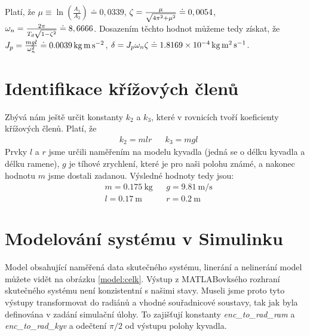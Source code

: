 \documentclass[11pt,a4paper]{article}
\begin{document}
Platí, že $\mu \equiv \ln{(\frac{A_1}{A_2})} \doteq 0,0339$, $\zeta = \frac{\mu}{\sqrt{4 \pi^2 + \mu^2}} \doteq 0,0054$, $\omega_n = \frac{2 \pi}{T_d \sqrt{1 - \zeta^2}} \doteq 8,6666$. Dosazením těchto hodnot můžeme tedy získat, že $J_p = \frac{m g l}{\omega_n^2} \doteq \SI{0.0039}{\kilo \gram \metre \per \second \squared}$, $\delta = J_p \wn \ut \doteq \SI{1.8169e-04}{\kg \m \squared \per \second}$.



\section{Identifikace křížových členů}
Zbývá nám ještě určit konstanty $k_2$ a $k_3$, které v rovnicích tvoří koeficienty křížových členů. Platí, že
\begin{align*}
&k_2 = mlr && k_3 = mgl
\end{align*}
Prvky $l$ a $r$ jsme určili naměřením na modelu kyvadla (jedná se o délku kyvadla a délku ramene), $g$ je tíhové zrychlení, které je pro naši polohu známé, a nakonec hodnotu $m$ jsme dostali zadanou. Výsledné hodnoty tedy jsou:
\begin{align*}
&m = \SI{0,175}{ \kilo \gram} &&g = \SI{9,81}{\meter \per \second}	\\
&l = \SI{0,17}{\meter} &&r = \SI{0,2}{\meter}
\end{align*}




\section{Modelování systému v Simulinku}
Model obsahující naměřená data skutečného systému, linerání a nelinerání model můžete vidět na obrázku \ref{model:celk}. Výstup z MATLABovksého rozhraní skutečného systému není konzistentní s našimi stavy. Museli jsme proto tyto výstupy transformovat do radiánů a vhodné souřadnicové soustavy, tak jak byla definována v zadání simulační úlohy. To zajišťují konstanty \textit{enc{\_}to{\_}rad{\_}ram} a \textit{enc{\_}to{\_}rad{\_}kyv} a odečtení $\pi/2$ od výstupu polohy kyvadla. 
\end{document}
